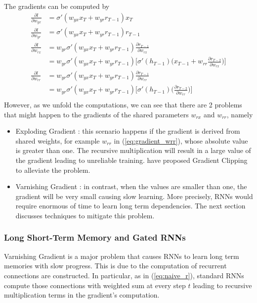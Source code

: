 The gradients can be computed by 
\begin{align}
	\frac{\partial l}{\partial w_{yx}} &= \sigma'(w_{yx} x_T   + w_{yr} r_{T-1}) x_T \\
	\frac{\partial l}{\partial w_{yr}} &= \sigma'(w_{yx} x_T   + w_{yr} r_{T-1}) r_{T-1} \\
	\frac{\partial l}{\partial w_{rx}} &= 	w_{yr} \sigma'(w_{yx} x_T   + w_{yr} r_{T-1}) \frac{\partial r_{T-1}}{\partial w_{rx}} \\
	&= w_{yr} \sigma'(w_{yx} x_T   + w_{yr} r_{T-1})  \Bigg[ \sigma'(h_{T-1}) \bigg( x_{T-1} + w_{rr}  \frac{\partial r_{T-2}}{\partial w_{rx}} \bigg) \Bigg]  \label{eq:gradient_wrr}  \\
	\frac{\partial l}{\partial w_{rr}} &= w_{yr} \sigma'(w_{yx} x_T   + w_{yr} r_{T-1})  \frac{\partial r_{T-1}}{\partial w_{rr}}  \\
	&= w_{yr} \sigma'(w_{yx} x_T   + w_{yr} r_{T-1})  \Bigg[ \sigma'(h_{T-1}) \bigg( \frac{\partial r_{T-2}}{\partial w_{rr}} \bigg) \Bigg] \\
\end{align}
However, as we unfold the computations, we can see that there are 2 problems that might happen to the gradients of the shared parameters $w_{rx}$ and $ w_{rr}$, namely
\begin{itemize}
	\item Exploding Gradient : this scenario happens if the gradient is derived from shared weights, for example $w_{rr}$ in  (\ref{eq:gradient_wrr}), whose absolute value is greater than one. The recursive multiplication will result in a large value of the gradient leading to unreliable training. \cite{PascanuUnderstandingexplodinggradient2012} have proposed Gradient Clipping to alleviate the problem.
	\item Varnishing Gradient : in contrast, when the values are smaller than one, the gradient will be very small causing slow learning. More precisely, RNNs would require enormous of time to learn long term dependencies. The next section discusses techniques to mitigate this problem.
\end{itemize}


\subsubsection{Long Short-Term Memory and Gated RNNs}
Varnishing Gradient is a major problem that causes RNNs to learn long term memories with slow progress. This is due to the computation of recurrent connections are constructed. In particular, as in (\ref{eq:naive_r}), standard RNNs compute those connections with weighted sum at every step $t$ leading to recursive multiplication terms in the gradient's computation.

